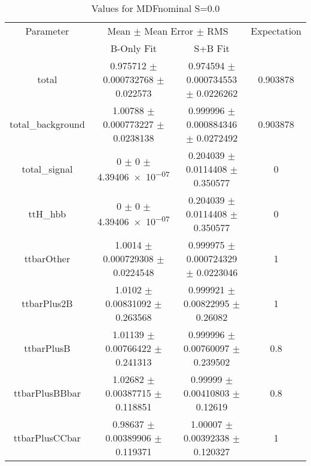 \begin{table}
\centering
\caption{Values for MDFnominal S=0.0}
\begin{tabular}{cccc}
\toprule
Parameter & \multicolumn{2}{c}{Mean $\pm$ Mean Error $\pm$ RMS} & Expectation\\
 & B-Only Fit & S+B Fit & \\
\midrule
total & \num{0.975712} $\pm$ \num{0.000732768} $\pm$ \num{0.022573} & \num{0.974594} $\pm$ \num{0.000734553} $\pm$ \num{0.0226262} & \num{0.903878}\\
total\_background & \num{1.00788} $\pm$ \num{0.000773227} $\pm$ \num{0.0238138} & \num{0.999996} $\pm$ \num{0.000884346} $\pm$ \num{0.0272492} & \num{0.903878}\\
total\_signal & \num{0} $\pm$ \num{0} $\pm$ \num{4.39406e-07} & \num{0.204039} $\pm$ \num{0.0114408} $\pm$ \num{0.350577} & \num{0}\\
ttH\_hbb & \num{0} $\pm$ \num{0} $\pm$ \num{4.39406e-07} & \num{0.204039} $\pm$ \num{0.0114408} $\pm$ \num{0.350577} & \num{0}\\
ttbarOther & \num{1.0014} $\pm$ \num{0.000729308} $\pm$ \num{0.0224548} & \num{0.999975} $\pm$ \num{0.000724329} $\pm$ \num{0.0223046} & \num{1}\\
ttbarPlus2B & \num{1.0102} $\pm$ \num{0.00831092} $\pm$ \num{0.263568} & \num{0.999921} $\pm$ \num{0.00822995} $\pm$ \num{0.26082} & \num{1}\\
ttbarPlusB & \num{1.01139} $\pm$ \num{0.00766422} $\pm$ \num{0.241313} & \num{0.999996} $\pm$ \num{0.00760097} $\pm$ \num{0.239502} & \num{0.8}\\
ttbarPlusBBbar & \num{1.02682} $\pm$ \num{0.00387715} $\pm$ \num{0.118851} & \num{0.99999} $\pm$ \num{0.00410803} $\pm$ \num{0.12619} & \num{0.8}\\
ttbarPlusCCbar & \num{0.98637} $\pm$ \num{0.00389906} $\pm$ \num{0.119371} & \num{1.00007} $\pm$ \num{0.00392338} $\pm$ \num{0.120327} & \num{1}\\
\bottomrule
\end{tabular}
\end{table}